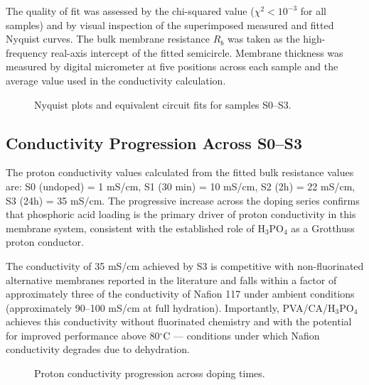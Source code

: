 \documentclass[12pt,a4paper]{report}
\begin{document}
The quality of fit was assessed by the chi-squared value (\(\chi^2 < 10^{-3}\) for all samples) and by visual inspection of the superimposed measured and fitted Nyquist curves. The bulk membrane resistance \(R_b\) was taken as the high-frequency real-axis intercept of the fitted semicircle. Membrane thickness was measured by digital micrometer at five positions across each sample and the average value used in the conductivity calculation.\cite{65,67}

\begin{figure}[h!]
\centering
{}
\caption{Nyquist plots and equivalent circuit fits for samples S0–S3.}
\label{fig:nyquist}
\end{figure}

\subsection{Conductivity Progression Across S0–S3}
The proton conductivity values calculated from the fitted bulk resistance values are: S0 (undoped) = 1 mS/cm, S1 (30 min) = 10 mS/cm, S2 (2h) = 22 mS/cm, S3 (24h) = 35 mS/cm. The progressive increase across the doping series confirms that phosphoric acid loading is the primary driver of proton conductivity in this membrane system, consistent with the established role of H\(_3\)PO\(_4\) as a Grotthuss proton conductor.\cite{21,55,56}

The conductivity of 35 mS/cm achieved by S3 is competitive with non-fluorinated alternative membranes reported in the literature and falls within a factor of approximately three of the conductivity of Nafion 117 under ambient conditions (approximately 90–100 mS/cm at full hydration).\cite{5,6} Importantly, PVA/CA/H\(_3\)PO\(_4\) achieves this conductivity without fluorinated chemistry and with the potential for improved performance above 80\(^\circ\)C — conditions under which Nafion conductivity degrades due to dehydration.\cite{3,4,5}

\begin{figure}[h!]
\centering
{}
\caption{Proton conductivity progression across doping times.}
\label{fig:conductivity-bars}
\end{figure}
\end{document}

